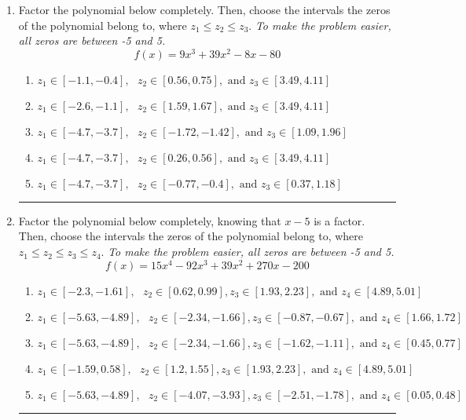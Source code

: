 \documentclass[14pt]{extbook}
\newcommand{\litem}[1]{\item#1\hspace*{-1cm}\rule{\textwidth}{0.4pt}}
\begin{document}
\begin{enumerate}
{\begin{enumerate}[label=\Alph*.]
\end{enumerate} }
\litem{
Factor the polynomial below completely. Then, choose the intervals the zeros of the polynomial belong to, where $z_1 \leq z_2 \leq z_3$. \textit{To make the problem easier, all zeros are between -5 and 5.}\[ f(x) = 9x^{3} +39 x^{2} -8 x -80 \]\begin{enumerate}[label=\Alph*.]
\item \( z_1 \in [-1.1, -0.4], \text{   }  z_2 \in [0.56, 0.75], \text{   and   } z_3 \in [3.49, 4.11] \)
\item \( z_1 \in [-2.6, -1.1], \text{   }  z_2 \in [1.59, 1.67], \text{   and   } z_3 \in [3.49, 4.11] \)
\item \( z_1 \in [-4.7, -3.7], \text{   }  z_2 \in [-1.72, -1.42], \text{   and   } z_3 \in [1.09, 1.96] \)
\item \( z_1 \in [-4.7, -3.7], \text{   }  z_2 \in [0.26, 0.56], \text{   and   } z_3 \in [3.49, 4.11] \)
\item \( z_1 \in [-4.7, -3.7], \text{   }  z_2 \in [-0.77, -0.4], \text{   and   } z_3 \in [0.37, 1.18] \)

\end{enumerate} }
\litem{
Factor the polynomial below completely, knowing that $x -5$ is a factor. Then, choose the intervals the zeros of the polynomial belong to, where $z_1 \leq z_2 \leq z_3 \leq z_4$. \textit{To make the problem easier, all zeros are between -5 and 5.}\[ f(x) = 15x^{4} -92 x^{3} +39 x^{2} +270 x -200 \]\begin{enumerate}[label=\Alph*.]
\item \( z_1 \in [-2.3, -1.61], \text{   }  z_2 \in [0.62, 0.99], z_3 \in [1.93, 2.23], \text{   and   } z_4 \in [4.89, 5.01] \)
\item \( z_1 \in [-5.63, -4.89], \text{   }  z_2 \in [-2.34, -1.66], z_3 \in [-0.87, -0.67], \text{   and   } z_4 \in [1.66, 1.72] \)
\item \( z_1 \in [-5.63, -4.89], \text{   }  z_2 \in [-2.34, -1.66], z_3 \in [-1.62, -1.11], \text{   and   } z_4 \in [0.45, 0.77] \)
\item \( z_1 \in [-1.59, 0.58], \text{   }  z_2 \in [1.2, 1.55], z_3 \in [1.93, 2.23], \text{   and   } z_4 \in [4.89, 5.01] \)
\item \( z_1 \in [-5.63, -4.89], \text{   }  z_2 \in [-4.07, -3.93], z_3 \in [-2.51, -1.78], \text{   and   } z_4 \in [0.05, 0.48] \)


\end{enumerate}}
\end{enumerate}
\end{document}
